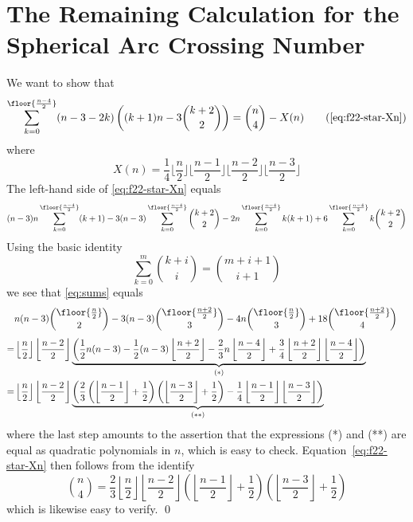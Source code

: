 \section{The Remaining Calculation for the Spherical Arc Crossing Number}
\label{sec:appendix-calculation}
We want to show that 
\begin{equation}
\sum_{k=0}^{\floor{\frac{n-4}{2}}} (n-3-2k)\left((k+1)n-3\binom{k+2}{2}\right)
=\binom{n}{4}-X(n)
\tag{\ref{eq:f22-star-Xn}}
\end{equation}
where 
\[
X(n)=\frac{1}{4}\Big\lfloor \frac{n}{2}\Big\rfloor \Big\lfloor \frac{n-1}{2} \Big\rfloor \Big\lfloor \frac{n-2}{2} \Big\rfloor \Big\lfloor \frac{n-3}{2}\Big\rfloor
\]
The left-hand side of \eqref{eq:f22-star-Xn} equals
\begin{equation}
\label{eq:sums}
(n-3)n\sum_{k=0}^{\floor{\frac{n-4}{2}}} (k+1) 
- 3(n-3)\sum_{k=0}^{\floor{\frac{n-4}{2}}} \binom{k+2}{2}
- 2n\sum_{k=0}^{\floor{\frac{n-4}{2}}} k(k+1) 
+ 6 \sum_{k=0}^{\floor{\frac{n-4}{2}}} k\binom{k+2}{2}
\end{equation}
Using the basic identity
\[ 
\sum_{k = 0}^m \binom{k+i}{i} = \binom{m+i+1}{i+1} 
\]
we see that \eqref{eq:sums} equals
\begin{eqnarray*}
& \displaystyle n(n-3) \binom{\floor{\frac{n}{2}}}{2} - 3 (n-3) \binom{\floor{\frac{n+2}{2}}}{3} - 4n \binom{\floor{\frac{n}{2}}}{3} + 18 \binom{\floor{\frac{n+2}{2}}}{4} & \\[1ex]
=& \displaystyle \left\lfloor \frac{n}{2} \right\rfloor \left\lfloor \frac{n-2}{2}\right\rfloor \underbrace{\left( \frac{1}{2} n(n-3) - \frac{1}{2} (n-3) \left\lfloor \frac{n+2}{2} \right\rfloor -\frac{2}{3}n \left\lfloor \frac{n-4}{2} \right \rfloor + \frac{3}{4} \left\lfloor \frac{n+2}{2} \right\rfloor \left\lfloor \frac{n-4}{2} \right\rfloor \right)}_{(*)}\\
= &  \displaystyle \left\lfloor \frac{n}{2} \right\rfloor \left\lfloor \frac{n-2}{2}\right\rfloor \underbrace{\left( \frac{2}{3} \left( \left\lfloor \frac{n-1}{2} \right\rfloor+ \frac{1}{2} \right) \left( \left\lfloor \frac{n-3}{2} \right\rfloor+ \frac{1}{2} \right) - \frac{1}{4} \left\lfloor \frac{n-1}{2} \right\rfloor \left\lfloor \frac{n-3}{2} \right\rfloor \right)}_{(**)}
\end{eqnarray*}
where the last step amounts to the assertion that the expressions (*) and (**) are equal as quadratic polynomials in $n$, which is easy to check. Equation~\eqref{eq:f22-star-Xn} then follows from the identify 
\[ 
\binom{n}{4} = \frac{2}{3}\left\lfloor \frac{n}{2} \right\rfloor \left\lfloor \frac{n-2}{2}\right\rfloor \left( \left\lfloor \frac{n-1}{2}\right\rfloor + \frac{1}{2} \right)  \left( \left\lfloor \frac{n-3}{2}\right\rfloor + \frac{1}{2} \right) 
\]
which is likewise easy to verify. \hfill \qed
%
%
%
%
